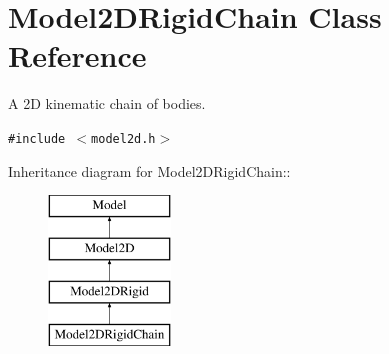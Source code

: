\section{Model2DRigid\-Chain  Class Reference}
\label{classModel2DRigidChain}
A 2D kinematic chain of bodies. 


{\tt \#include $<$model2d.h$>$}

Inheritance diagram for Model2DRigid\-Chain::\begin{figure}[H]
\begin{center}
\leavevmode
\includegraphics[height=4cm]{classModel2DRigidChain}
\end{center}
\end{figure}
